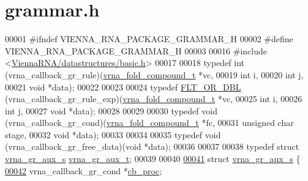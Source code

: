 \hypertarget{grammar_8h_source}{}\section{grammar.\+h}
\label{grammar_8h_source}

\begin{DoxyCode}
00001 \textcolor{preprocessor}{#ifndef VIENNA\_RNA\_PACKAGE\_GRAMMAR\_H}
00002 \textcolor{preprocessor}{#define VIENNA\_RNA\_PACKAGE\_GRAMMAR\_H}
00003 
00016 \textcolor{preprocessor}{#include <\hyperlink{datastructures_2basic_8h}{ViennaRNA/datastructures/basic.h}>}
00017 
00018 \textcolor{keyword}{typedef} int (vrna\_callback\_gr\_rule)(\hyperlink{group__fold__compound_structvrna__fc__s}{vrna\_fold\_compound\_t}  *vc,
00019                                     \textcolor{keywordtype}{int}                   i,
00020                                     \textcolor{keywordtype}{int}                   j,
00021                                     \textcolor{keywordtype}{void}                  *data);
00022 
00023 
00024 \textcolor{keyword}{typedef} \hyperlink{group__data__structures_ga31125aeace516926bf7f251f759b6126}{FLT\_OR\_DBL} (vrna\_callback\_gr\_rule\_exp)(\hyperlink{group__fold__compound_structvrna__fc__s}{vrna\_fold\_compound\_t} *vc,
00025                                                \textcolor{keywordtype}{int}                  i,
00026                                                \textcolor{keywordtype}{int}                  j,
00027                                                \textcolor{keywordtype}{void}                 *data);
00028 
00029 
00030 \textcolor{keyword}{typedef} void (vrna\_callback\_gr\_cond)(\hyperlink{group__fold__compound_structvrna__fc__s}{vrna\_fold\_compound\_t} *fc,
00031                                      \textcolor{keywordtype}{unsigned} \textcolor{keywordtype}{char}        stage,
00032                                      \textcolor{keywordtype}{void}                 *data);
00033 
00034 
00035 \textcolor{keyword}{typedef} void (vrna\_callback\_gr\_free\_data)(\textcolor{keywordtype}{void} *data);
00036 
00037 
00038 \textcolor{keyword}{typedef} \textcolor{keyword}{struct }\hyperlink{group__grammar_structvrna__gr__aux__s}{vrna\_gr\_aux\_s} \hyperlink{group__grammar_structvrna__gr__aux__s}{vrna\_gr\_aux\_t};
00039 
00040 
\hyperlink{group__grammar}{00041} \textcolor{keyword}{struct }\hyperlink{group__grammar_structvrna__gr__aux__s}{vrna\_gr\_aux\_s} \{
\hyperlink{group__grammar_ad4b601db6dc2e18854042b096ee780cc}{00042}   vrna\_callback\_gr\_cond       *\hyperlink{group__grammar_ad4b601db6dc2e18854042b096ee780cc}{cb\_proc}; 

\end{DoxyCode}
